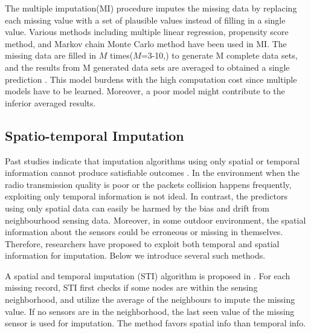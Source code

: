 The multiple imputation(MI) procedure\cite{yuan2000multiple} imputes the missing data by replacing each missing value with a set of plausible values instead of filling in a single value. Various methods including multiple linear regression, propensity score method, and Markov chain Monte Carlo method have been used in MI. The missing data are filled in $M$ times($M$=3-10,\cite{Little:hotdeck}) to generate M complete data sets, and the results from M generated data sets are averaged to obtained a single prediction \cite{yuan2000multiple}. 
This model burdens with the high computation cost since multiple models have to be learned. Moreover, a poor model might contribute to the inferior averaged results. 



\subsection{Spatio-temporal Imputation}    
Past studies indicate that imputation algorithms using only spatial or temporal information cannot produce satisfiable outcomes \cite{Lim:robust}. In the environment when the radio transmission quality is poor or the packets collision happens frequently, exploiting only temporal information is not ideal. In contrast, the predictors using only spatial data can easily be harmed by the bias and drift from neighbourhood sensing data. Moreover, in some outdoor environment, the spatial information about the sensors could be erroneous or missing in themselves. Therefore, researchers have proposed to exploit both temporal and spatial information for imputation.
Below we introduce several such methods.   

A spatial and temporal imputation (STI) algorithm is proposed in \cite{li2008spatial}. 
For each missing record, STI first checks if some nodes are within the sensing neighborhood, and utilize 
the average of the neighbours to impute the missing value. If no sensors are in the neighborhood, the last seen value of the missing sensor is used for imputation. The method favors spatial info than temporal info. 

